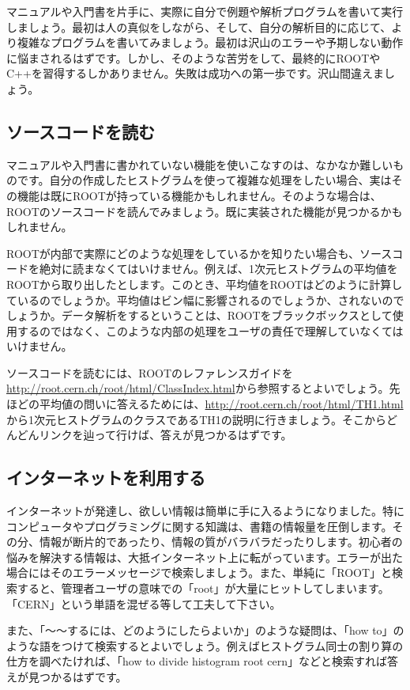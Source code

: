 マニュアルや入門書を片手に、実際に自分で例題や解析プログラムを書いて実行しましょう。最初は人の真似をしながら、そして、自分の解析目的に応じて、より複雑なプログラムを書いてみましょう。最初は沢山のエラーや予期しない動作に悩まされるはずです。しかし、そのような苦労をして、最終的にROOTやC++を習得するしかありません。失敗は成功への第一歩です。沢山間違えましょう。

\subsection{ソースコードを読む}

マニュアルや入門書に書かれていない機能を使いこなすのは、なかなか難しいものです。自分の作成したヒストグラムを使って複雑な処理をしたい場合、実はその機能は既にROOTが持っている機能かもしれません。そのような場合は、ROOTのソースコードを読んでみましょう。既に実装された機能が見つかるかもしれません。

ROOTが内部で実際にどのような処理をしているかを知りたい場合も、ソースコードを絶対に読まなくてはいけません。例えば、1次元ヒストグラムの平均値をROOTから取り出したとします。このとき、平均値をROOTはどのように計算しているのでしょうか。平均値はビン幅に影響されるのでしょうか、されないのでしょうか。データ解析をするということは、ROOTをブラックボックスとして使用するのではなく、このような内部の処理をユーザの責任で理解していなくてはいけません。

ソースコードを読むには、ROOTのレファレンスガイドを\url{http://root.cern.ch/root/html/ClassIndex.html}から参照するとよいでしょう。先ほどの平均値の問いに答えるためには、\url{http://root.cern.ch/root/html/TH1.html}から1次元ヒストグラムのクラスであるTH1の説明に行きましょう。そこからどんどんリンクを辿って行けば、答えが見つかるはずです。

\subsection{インターネットを利用する}
インターネットが発達し、欲しい情報は簡単に手に入るようになりました。特にコンピュータやプログラミングに関する知識は、書籍の情報量を圧倒します。その分、情報が断片的であったり、情報の質がバラバラだったりします。初心者の悩みを解決する情報は、大抵インターネット上に転がっています。エラーが出た場合にはそのエラーメッセージで検索しましょう。また、単純に「ROOT」と検索すると、管理者ユーザの意味での「root」が大量にヒットしてしまいます。「CERN」という単語を混ぜる等して工夫して下さい。

また、「〜〜するには、どのようにしたらよいか」のような疑問は、「how to」のような語をつけて検索するとよいでしょう。例えばヒストグラム同士の割り算の仕方を調べたければ、「how to divide histogram root cern」などと検索すれば答えが見つかるはずです。

